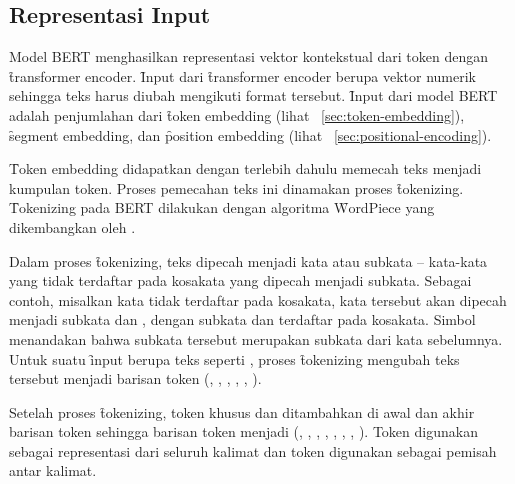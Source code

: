 \subsection{Representasi Input}

Model BERT menghasilkan representasi vektor kontekstual dari token dengan \f{transformer encoder}. \f{Input} dari \f{transformer encoder} berupa vektor numerik sehingga teks harus diubah mengikuti format tersebut. \f{Input} dari model BERT adalah penjumlahan dari \f{token embedding} (lihat \sect~\ref{sec:token-embedding}), \f{segment embedding}, dan \f{position embedding} (lihat \sect~\ref{sec:positional-encoding}).

\f{Token embedding} didapatkan dengan terlebih dahulu memecah teks menjadi kumpulan token. Proses pemecahan teks ini dinamakan proses \f{tokenizing}. \f{Tokenizing} pada BERT dilakukan dengan algoritma \f{WordPiece} yang dikembangkan oleh \cite{tokenizer}.

Dalam proses \f{tokenizing}, teks dipecah menjadi kata atau subkata -- kata-kata yang tidak terdaftar pada kosakata yang dipecah menjadi subkata. Sebagai contoh, misalkan kata  tidak terdaftar pada kosakata, kata tersebut akan dipecah menjadi subkata  dan , dengan subkata  dan  terdaftar pada kosakata. Simbol \code{\#\#} menandakan bahwa subkata tersebut merupakan subkata dari kata sebelumnya. Untuk suatu \f{input} berupa teks seperti , proses \f{tokenizing} mengubah teks tersebut menjadi barisan token (, , , , , ). 

Setelah proses \f{tokenizing}, token khusus \code{[CLS]} dan \code{[SEP]} ditambahkan di awal dan akhir barisan token sehingga barisan token menjadi (\code{[CLS]}, , , , , , , \code{[SEP]}). Token \code{[CLS]} digunakan sebagai representasi dari seluruh kalimat dan token \code{[SEP]} digunakan sebagai pemisah antar kalimat.

